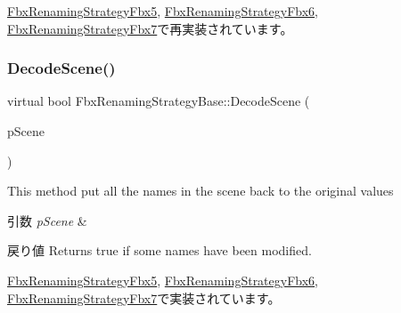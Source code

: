 \hyperlink{class_fbx_renaming_strategy_fbx5_a581d1d5e0b4fcc9f9702be12669fc795}{Fbx\+Renaming\+Strategy\+Fbx5}, \hyperlink{class_fbx_renaming_strategy_fbx6_acb37bd5bc46fdf1e4bf77d3db6654d45}{Fbx\+Renaming\+Strategy\+Fbx6}, \hyperlink{class_fbx_renaming_strategy_fbx7_a4495cc04e089d7e0d432e50a3161ea50}{Fbx\+Renaming\+Strategy\+Fbx7}で再実装されています。

\mbox{\label{class_fbx_renaming_strategy_base_a6c368dff1424b4b54cdfa49ad49bf09c}} 
\subsubsection{\texorpdfstring{Decode\+Scene()}{DecodeScene()}}
{\footnotesize\ttfamily virtual bool Fbx\+Renaming\+Strategy\+Base\+::\+Decode\+Scene (\begin{DoxyParamCaption}\item[{\hyperlink{class_fbx_scene}{Fbx\+Scene} $\ast$}]{p\+Scene }\end{DoxyParamCaption})\hspace{0.3cm}{\ttfamily [pure virtual]}}

This method put all the names in the scene back to the original values 
\begin{DoxyParams}{引数}
{\em p\+Scene} & \\
\hline
\end{DoxyParams}
\begin{DoxyReturn}{戻り値}
Returns true if some names have been modified. 
\end{DoxyReturn}


\hyperlink{class_fbx_renaming_strategy_fbx5_a3af6482297f78deb29a48a9f26ded270}{Fbx\+Renaming\+Strategy\+Fbx5}, \hyperlink{class_fbx_renaming_strategy_fbx6_a663b913a3f88b49e847f9c9c99ab16f2}{Fbx\+Renaming\+Strategy\+Fbx6}, \hyperlink{class_fbx_renaming_strategy_fbx7_a203a4659e427f4c6046eff93031a24bf}{Fbx\+Renaming\+Strategy\+Fbx7}で実装されています。

\mbox{\label{class_fbx_renaming_strategy_base_acc30037744da35fa2b59fdd4ff6d9ede}} 
